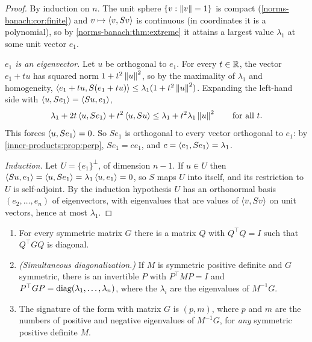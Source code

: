 \begin{notechapter}
\begin{proof}
By induction on $n$. The unit sphere $\{v : \left\|v\right\| = 1\}$ is compact
(\cref{norms-banach:cor:finite}) and $v\mapsto\left\langle v, Sv \right\rangle$ is continuous
(in coordinates it is a polynomial), so by
\cref{norms-banach:thm:extreme} it attains a largest value $\lambda_1$ at
some unit vector $e_1$.

\emph{$e_1$ is an eigenvector.} Let $u$ be orthogonal to $e_1$. For every
$t\in\mathbb{R}$, the vector $e_1 + tu$ has squared norm $1 + t^2\left\|u\right\|^2$, so
by the maximality of $\lambda_1$ and homogeneity,
$\left\langle e_1 + tu, S(e_1 + tu) \right\rangle\leq\lambda_1(1 + t^2\left\|u\right\|^2)$. Expanding
the left-hand side with $\left\langle u, Se_1 \right\rangle = \left\langle Su, e_1 \right\rangle$,
\[
  \lambda_1 + 2t\left\langle u, Se_1 \right\rangle + t^2\left\langle u, Su \right\rangle
  \leq\lambda_1 + t^2\lambda_1\left\|u\right\|^2 \qquad\text{for all } t .
\]
This forces $\left\langle u, Se_1 \right\rangle = 0$. So $Se_1$ is orthogonal to every vector
orthogonal to $e_1$: by \cref{inner-products:prop:perp}, $Se_1 = ce_1$,
and $c = \left\langle e_1, Se_1 \right\rangle = \lambda_1$.

\emph{Induction.} Let $U = \{e_1\}^\perp$, of dimension $n - 1$. If
$u\in U$ then $\left\langle Su, e_1 \right\rangle = \left\langle u, Se_1 \right\rangle = \lambda_1\left\langle u, e_1 \right\rangle
= 0$, so $S$ maps $U$ into itself, and its restriction to $U$ is
self-adjoint. By the induction hypothesis $U$ has an orthonormal basis
$(e_2,\dots,e_n)$ of eigenvectors, with eigenvalues that are values of
$\left\langle v, Sv \right\rangle$ on unit vectors, hence at most $\lambda_1$.
\end{proof}

\begin{corollary}
\label{spectral-svd:cor:matrix}
\begin{enumerate}[nosep]
  \item For every symmetric matrix $G$ there is a matrix $Q$ with
        $Q^\top Q = I$ such that $Q^\top GQ$ is diagonal.
  \item \emph{(Simultaneous diagonalization.)} If $M$ is symmetric positive
        definite and $G$ symmetric, there is an invertible $P$ with
        $P^\top MP = I$ and $P^\top GP = \operatorname{diag}(\lambda_1,\dots,\lambda_n)$,
        where the $\lambda_i$ are the eigenvalues of $M^{-1}G$.
  \item The signature of the form with matrix $G$ is $(p, m)$, where $p$
        and $m$ are the numbers of positive and negative eigenvalues of
        $M^{-1}G$, for \emph{any} symmetric positive definite $M$.
\end{enumerate}
\end{corollary}


\end{notechapter}

